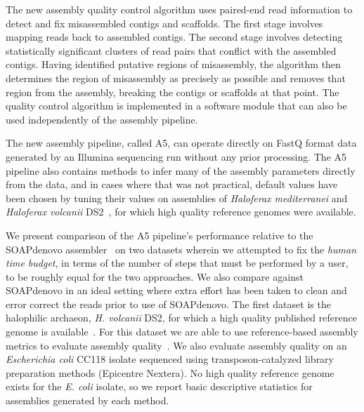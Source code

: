 \documentclass[10pt]{article}
\begin{document}
The new assembly quality control algorithm uses paired-end read information
to detect and fix misassembled contigs and scaffolds. The first stage involves mapping reads back to assembled contigs.
The second stage involves detecting statistically significant clusters of read pairs that conflict with the
assembled contigs. Having identified putative regions of misassembly, the algorithm then determines the 
region of misassembly as precisely as possible and removes that region from the assembly, breaking the contigs
or scaffolds at that point. The quality control algorithm is implemented in a software module that can also be used 
independently of the assembly pipeline.

The new assembly pipeline, called A5, can operate directly on FastQ format data generated by an Illumina sequencing run
without any prior processing. The A5 pipeline also contains methods to infer many of the assembly parameters directly
from the data, and in cases where that was not practical, default values have been chosen by tuning their values on 
assemblies of \textit{Haloferax mediterranei} and \textit{Haloferax volcanii} DS2~\cite{Hartman2010}, for which high quality reference genomes were available.

We present comparison of the A5 pipeline's performance relative to the SOAPdenovo assembler~\cite{Li2010} on two datasets wherein we attempted to fix the \textit{human time budget}, in terms of the number of steps that must be performed by a user, to be roughly equal for the two approaches. We also compare against SOAPdenovo in an ideal setting where extra effort has been taken to clean and error correct the reads prior to use of SOAPdenovo.
The first dataset
is the halophilic archaeon, \textit{H. volcanii} DS2, for which a high quality published reference genome is available~\cite{Hartman2010}. For this dataset we are able to use
reference-based assembly metrics to evaluate assembly quality~\cite{Darling2011}. We also evaluate assembly quality on an 
\textit{Escherichia coli} CC118 isolate sequenced using transposon-catalyzed library preparation methods (Epicentre Nextera). 
No high quality reference genome exists for the \textit{E. coli} isolate, so we report basic descriptive statistics for assemblies
generated by each method.
\end{document}
